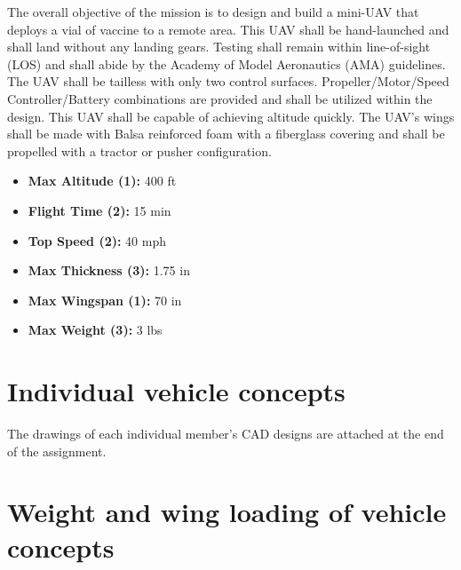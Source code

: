     The overall objective of the mission is to design and build a mini-UAV that deploys a vial of vaccine to a remote area. This UAV shall be hand-launched and shall land without any landing gears. Testing shall remain within line-of-sight (LOS) and shall abide by the Academy of Model Aeronautics (AMA) guidelines. The UAV shall be tailless with only two control surfaces. Propeller/Motor/Speed Controller/Battery combinations are provided and shall be utilized within the design. This UAV shall be capable of achieving altitude quickly. The UAV's wings shall be made with Balsa reinforced foam with a fiberglass covering and shall be propelled with a tractor or pusher configuration.
    
    \begin{itemize}
        \item \textbf{Max Altitude (1):} 400 ft
        \item \textbf{Flight Time (2):} 15 min
        \item \textbf{Top Speed (2):} 40 mph
        \item \textbf{Max Thickness (3):} 1.75 in
        \item \textbf{Max Wingspan (1):} 70 in
        \item \textbf{Max Weight (3):} 3 lbs
    \end{itemize}


\section{Individual vehicle concepts}

    The drawings of each individual member's CAD designs are attached at the end of the assignment.

\section{Weight and wing loading of vehicle concepts}
    
